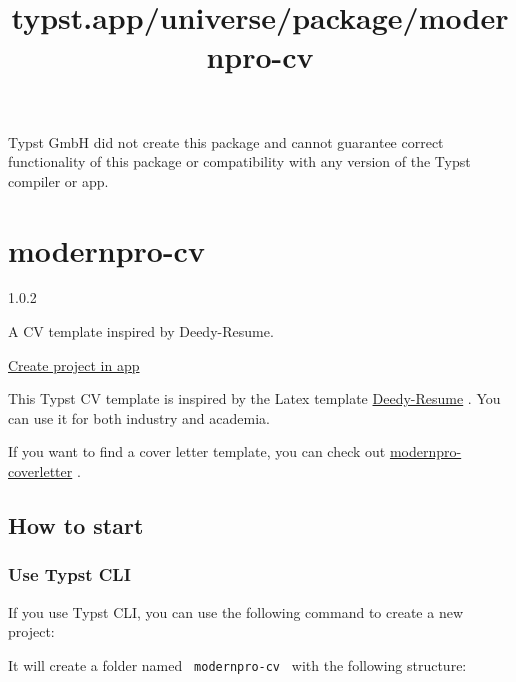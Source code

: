 Typst GmbH did not create this package and cannot guarantee correct
functionality of this package or compatibility with any version of the
Typst compiler or app.


\title{typst.app/universe/package/modernpro-cv}

\label{banner}
\label{template-thumbnail}

\section{modernpro-cv}\label{modernpro-cv}

{ 1.0.2 }

A CV template inspired by Deedy-Resume.

\href{/app?template=modernpro-cv&version=1.0.2}{Create project in app}

\label{readme}
This Typst CV template is inspired by the Latex template
\href{https://github.com/deedy/Deedy-Resume}{Deedy-Resume} . You can use
it for both industry and academia.

If you want to find a cover letter template, you can check out
\href{https://github.com/jxpeng98/typst-coverletter}{modernpro-coverletter}
.

\subsection{How to start}\label{how-to-start}

\subsubsection{Use Typst CLI}\label{use-typst-cli}

If you use Typst CLI, you can use the following command to create a new
project:

\begin{Shaded}
\begin{Highlighting}[]
\end{Highlighting}
\end{Shaded}

It will create a folder named \texttt{\ modernpro-cv\ } with the
following structure:

\begin{Shaded}
\begin{Highlighting}[]
\end{Highlighting}
\end{Shaded}

